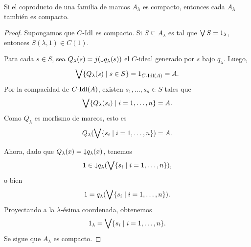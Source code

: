 \begin{lemma}
    Si el coproducto de una familia de marcos
    $A_\lambda$ es compacto, entonces cada $A_\lambda$
    también es compacto.
\end{lemma}
\begin{proof}
    Supongamos que $C\text{-}\mathrm{Idl}$ es compacto.
    Si $S\subseteq A_\lambda$ es tal que $\bigvee S=1_\lambda$,
    entonces $S(\lambda,1)\in C(1)$.
    
    Para cada $s\in S$, sea $Q_\lambda(s)
    = j({\downarrow} q_\lambda(s))$
    el $C$-ideal generado por $s$ bajo $q_\lambda$.
    Luego,
    \[
        \bigvee\{Q_\lambda(s) \mid s\in S\} = 1_{C\text{-}\mathrm{Idl}(A)} = A
    .\]
    Por la compacidad de $C\text{-}\mathrm{Idl}(A)$,
    existen $s_1,\dots,s_n\in S$ tales que
    \[
        \bigvee\{Q_\lambda(s_i) \mid i=1,\dots,n\} = A
    .\]
    Como $Q_\lambda$ es morfismo de marcos, esto es
    \[
        Q_\lambda(\bigvee\{s_i \mid i=1,\dots,n\}) = A
    .\]
    
    Ahora, dado que $Q_\lambda(x) = {\downarrow} q_\lambda(x)$, tenemos
    \[
        1 \in {\downarrow} q_\lambda(\bigvee\{s_i \mid i=1,\dots,n\})
    ,\]
    o bien
    \[
        1 = q_\lambda(\bigvee\{s_i \mid i=1,\dots,n\})
    .\]
    Proyectando a la $\lambda$-ésima coordenada, obtenemos
    \[
        1_\lambda = \bigvee\{s_i \mid i=1,\dots,n\}
    .\]
    Se sigue que $A_\lambda$ es compacto.
\end{proof}

